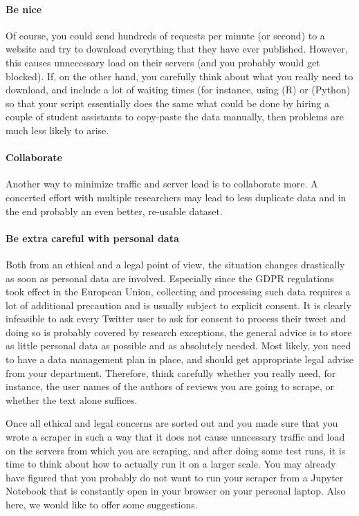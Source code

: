 \paragraph{Be nice} Of course, you could send hundreds of requests per minute (or second) to a website and try to download everything that they have ever published. However, this causes unnecessary load on their servers (and you probably would get blocked). If, on the other hand, you carefully think about what you really need to download, and include a lot of waiting times (for instance, using  (R) or  (Python) so that your script essentially does the same what could be done by hiring a couple of student assistants to copy-paste the data manually, then problems are much less likely to arise.

\paragraph{Collaborate} Another way to minimize traffic and server load is to collaborate more. A concerted effort with multiple researchers may lead to less duplicate data and in the end probably an even better, re-usable dataset.

\paragraph{Be extra careful with personal data} Both from an ethical and a legal point of view, the situation changes drastically as soon as personal data are involved. Especially since the GDPR regulations took effect in the European Union, collecting and processing such data requires a lot of additional precaution and is usually subject to explicit consent. It is clearly infeasible to ask every Twitter user to ask for consent to process their tweet and doing so is probably covered by research exceptions, the general advice is to store as little personal data as possible and as absolutely needed. Most likely, you need to have a data management plan in place, and should get appropriate legal advise from your department. Therefore, think carefully whether you really need, for instance, the user names of the authors of reviews you are going to scrape, or whether the text alone suffices.

Once all ethical and legal concerns are sorted out and you made sure that you wrote a scraper in such a way that it does not cause unncessary traffic and load on the servers from which you are scraping, and after doing some test runs, it is time to think about how to actually run it on a larger scale. You may already have figured that you probably do not want to run your scraper from a Jupyter Notebook that is constantly open in your browser on your personal laptop. Also here, we would like to offer some suggestions.

